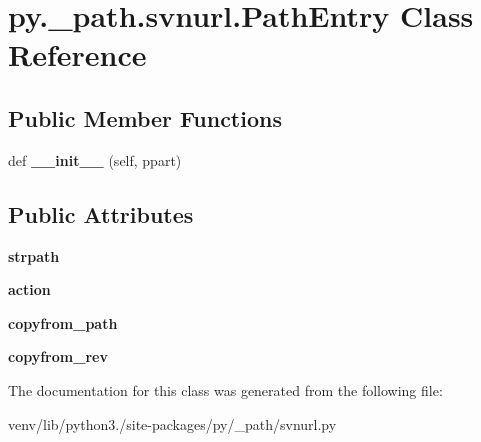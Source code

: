 \hypertarget{classpy_1_1__path_1_1svnurl_1_1_path_entry}{}\section{py.\+\_\+path.\+svnurl.\+Path\+Entry Class Reference}
\label{classpy_1_1__path_1_1svnurl_1_1_path_entry}
\subsection*{Public Member Functions}
\begin{DoxyCompactItemize}
\item 
\mbox{\label{classpy_1_1__path_1_1svnurl_1_1_path_entry_a4c72d5586809645313f3f21f0df62eff}} 
def {\bfseries \+\_\+\+\_\+init\+\_\+\+\_\+} (self, ppart)
\end{DoxyCompactItemize}
\subsection*{Public Attributes}
\begin{DoxyCompactItemize}
\item 
\mbox{\label{classpy_1_1__path_1_1svnurl_1_1_path_entry_a96fdeaa13cba19739f5c673a63de0d1d}} 
{\bfseries strpath}
\item 
\mbox{\label{classpy_1_1__path_1_1svnurl_1_1_path_entry_ad7b7487e9f93f3684d901335f3d5f6ae}} 
{\bfseries action}
\item 
\mbox{\label{classpy_1_1__path_1_1svnurl_1_1_path_entry_add6c4a91d02bc7007fb8f906f467b0b7}} 
{\bfseries copyfrom\+\_\+path}
\item 
\mbox{\label{classpy_1_1__path_1_1svnurl_1_1_path_entry_aa36fe1243b7516e8cb2322a7d48705cb}} 
{\bfseries copyfrom\+\_\+rev}
\end{DoxyCompactItemize}


The documentation for this class was generated from the following file\+:\begin{DoxyCompactItemize}
\item 
venv/lib/python3./site-\/packages/py/\+\_\+path/svnurl.\+py\end{DoxyCompactItemize}

